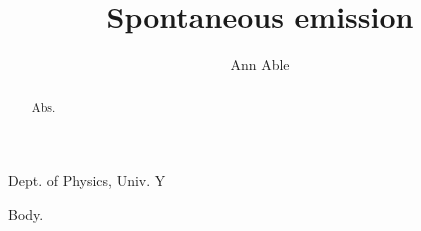 \documentclass{aastex701}
\providecommand{\affil}[1]{Dept. of Physics, #1}
\begin{document}
\title{Spontaneous emission}
\author{Ann Able}
\affil{Univ. Y}
\begin{abstract}Abs.\end{abstract}
\maketitle
Body.
\end{document}
